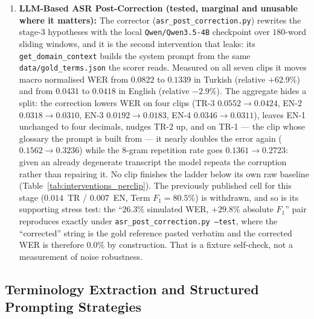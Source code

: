 \documentclass[conference]{IEEEtran}
\begin{document}
\begin{enumerate}
$0.0194 \rightarrow 0.0869$ and wall clock rises $55\,\text{s} \rightarrow 398\,\text{s}$
($7.2\times$) to buy one additional gold mention (coverage $96.9\% \rightarrow 100.0\%$, which is
the injected list coming back). The five clips without a gold list are byte-identical to the VAD
stage, which serves as the determinism control for this comparison.
\item \textbf{LLM-Based ASR Post-Correction (tested, marginal and unusable where it matters):} The
corrector (\texttt{asr\_post\_correction.py}) rewrites the stage-3 hypotheses with the local
\texttt{Qwen/Qwen3.5-4B} checkpoint over $180$-word sliding windows, and it is the second
intervention that leaks: its \texttt{get\_domain\_context} builds the system prompt from the same
\texttt{data/gold\_terms.json} the scorer reads. Measured on all seven clips it moves macro
normalised WER from $0.0822$ to $0.1339$ in Turkish (relative $+62.9\%$) and from $0.0431$ to
$0.0418$ in English (relative $-2.9\%$). The aggregate hides a split: the correction lowers WER on
four clips (TR-3 $0.0552\rightarrow0.0424$, EN-2 $0.0318\rightarrow0.0310$, EN-3
$0.0192\rightarrow0.0183$, EN-4 $0.0346\rightarrow0.0311$), leaves EN-1 unchanged to four decimals,
nudges TR-2 up, and on TR-1 --- the clip whose glossary the prompt is built from --- it nearly
doubles the error again ($0.1562\rightarrow0.3236$) while the $8$-gram repetition rate goes
$0.1361\rightarrow0.2723$: given an already degenerate transcript the model repeats the corruption
rather than repairing it. No clip finishes the ladder below its own raw baseline
(Table~\ref{tab:interventions_perclip}). The previously published cell for this stage
($0.014$~TR / $0.007$~EN, Term $F_1 = 80.5\%$) is withdrawn, and so is its supporting stress test:
the ``$26.3\%$ simulated WER, $+29.8\%$ absolute $F_1$'' pair reproduces exactly under
\texttt{asr\_post\_correction.py --test}, where the ``corrected'' string is the gold reference
pasted verbatim and the corrected WER is therefore $0.0\%$ by construction. That is a fixture
self-check, not a measurement of noise robustness.
\end{enumerate}




\subsection{Terminology Extraction and Structured Prompting Strategies}
\label{sec:prompt-strat}
\end{document}
